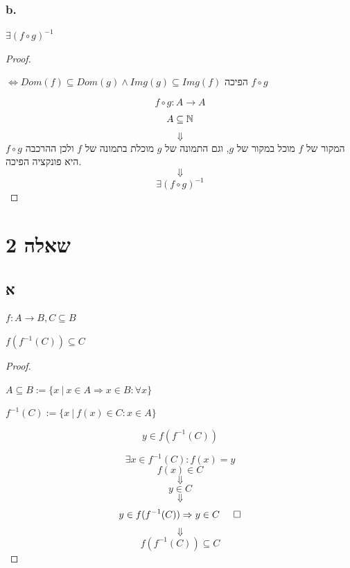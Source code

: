 \documentclass{article}
\begin{document}
\newpage

\subsubsection*{b.}

\begin{ntp}
    $ \exists (f \circ g)^{-1} $
\end{ntp}


\begin{proof}
    \begin{sen}
        $ \iff Dom(f) \subseteq Dom(g) \land Img(g) \subseteq Img(f) $
        הפיכה $ f \circ g $
    \end{sen}
    \[
        f \circ g: A \rightarrow A
    \]
    \[
        A \subseteq \Bbb{N}
    \]
    \[\Downarrow\]
    המקור של $f$
    מוכל במקור של $g$,
    וגם התמונה של $g$
    מוכלת בתמונה של $f$
    ולכן ההרכבה $ f \circ g $
    היא פונקציה הפיכה.
    \[\Downarrow\]
    \[
        \exists (f \circ g)^{-1}
    \]    
\end{proof}

\newpage

\section*{שאלה 2}

\subsection*{א}

\begin{letyehi}
    $ f: A \rightarrow B , C \subseteq B $
\end{letyehi}

\begin{ntp}
    $ f(f^{-1}(C)) \subseteq C $
\end{ntp}

\begin{proof}
    \begin{define}
        $ A \subseteq B := \{ x \: | \: x \in A \Rightarrow x \in B : \forall x \} $
    \end{define}
    \begin{define}
        $ f^{-1}(C) := \{ x \: | \: f(x) \in C : x \in A \} $
    \end{define}
    \begin{letyehi}
            \[
                y \in f(f^{-1}(C))
            \]
    \end{letyehi}
    \[
        \exists x \in f^{-1}(C) : f(x) = y
    \]
    \[
        f(x) \in C
    \]
    \[ \Downarrow \]
    \[
        \boxed{y \in C}
    \]
    \[ \Downarrow \]
    \[
        y \in f(f^{-1}(C)) \Rightarrow y \in C \hspace{0.5cm} \square
    \]
    \[ \Downarrow \]
    \[
        f(f^{-1}(C)) \subseteq C
    \]
\end{proof}
\end{document}
